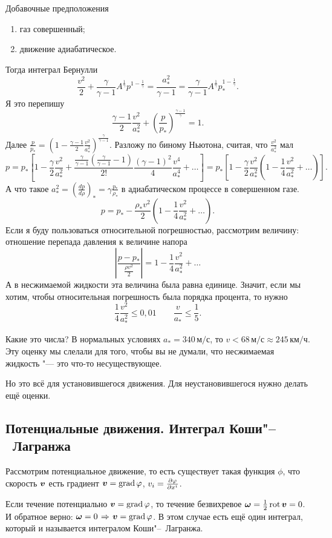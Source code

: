 Добавочные предположения
\begin{enumerate}
\item газ совершенный;
\item движение адиабатическое.
\end{enumerate}
Тогда интеграл Бернулли
\[
  \frac{v^2}2 + \frac{\gamma}{\gamma-1}A^{\frac1\gamma}p^{1-\frac1\gamma} = \frac{a_*^2}{\gamma-1} = \frac{\gamma}{\gamma-1}A^{\frac1\gamma}p_*^{1-\frac1\gamma}.
\]
Я это перепишу
\[
  \frac{\gamma-1}2\frac{v^2}{a_*^2}+\left(\frac p{p_*}\right)^{\frac{\gamma-1}\gamma}=1.
\]
Далее $\frac p{p_*} = \left(1-\frac{\gamma-1}2\frac{v^2}{a_*^2}\right)^{\frac\gamma{\gamma-1}}$. Разложу по биному Ньютона, считая, что $\frac{v^2}{a_*^2}$ мал
\[
  p=p_*\left[
	     1-\frac{\gamma}2\frac{v^2}{a_*^2}+\frac{\frac\gamma{\gamma-1}\left(\frac\gamma{\gamma-1}-1\right)}{2!}\frac{(\gamma-1)^2}{4}\frac{v^4}{a_*^4}+\dots
 	\right]
  =p_*\left[
	    1-\frac{\gamma}2\frac{v^2}{a_*^2}\left(1-\frac14\frac{v^2}{a_*^2}+\ldots\right)
	\right].
\]
А что такое $a_*^2 = \left(\frac{dp}{d\rho}\right)_* = \gamma\frac{p_*}{\rho_*}$ в адиабатическом процессе в совершенном газе.
\[
  p=p_* - \frac{\rho_*v^2}2\left(1-\frac14\frac{v^2}{a_*^2}+\dots\right).
\]
Если я буду пользоваться относительной погрешностью, рассмотрим величину: отношение перепада давления к величине напора
\[
  \left|
    \frac{p-p_*}{\frac{\rho v^2}2}
  \right| = 1 - \frac14 \frac{v^2}{a_*^2}+\dots
\]
А в несжимаемой жидкости эта величина была равна единице. Значит, если мы хотим, чтобы относительная погрешность была порядка процента, то нужно
\[
  \frac14\frac{v^2}{a_*^2}\le 0{,}01\qquad \frac v{a_*}\le\frac15.
\]

Какие это числа? В нормальных условиях $a_* = 340\,\text{м}/\text{с}$, то $v< 68\,\text{м}/\text{с}\approx 245\,\text{км}/\text{ч}$.
Эту оценку мы слелали для того, чтобы вы не думали, что несжимаемая жидкость "--- это что-то несуществующее.

Но это всё для установившегося движения. Для неустановившегося нужно делать ещё оценки.

\subsection{Потенциальные движения. Интеграл Коши"--~Лагранжа}
Рассмотрим потенциальное движение, то есть существует такая функция $\phi$, что скорость $\boldsymbol{v}$ есть градиент $\boldsymbol{v}= \operatorname{grad}\varphi$, $v_i = \frac{\partial \varphi}{\partial x^i}$.

Если течение потенциально $\boldsymbol{v}= \operatorname{grad} \varphi$, то течение безвихревое $\boldsymbol{\omega} = \frac12\operatorname{rot}\boldsymbol{v} = 0$. И обратное верно: $\ve\omega=0\imp \ve v= \grad\phi$. В этом случае есть ещё один интеграл, который и называется интегралом Коши"--~Лагранжа.

